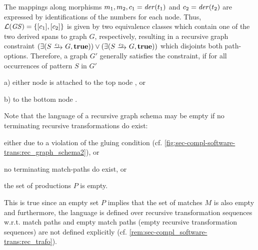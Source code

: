 \begin{remark}
The mappings along morphisms $m_1,m_2,c_1=\mathit{der}(t_1)$ and $c_2=\mathit{der}(t_2)$ are expressed by identifications of the numbers for each node.
Thus, $\mathcal{L}(\mathit{GS})=\{[c_1],[c_2]\}$ is given by two equivalence classes which contain one of the two derived spans to graph $G$, respectively, resulting in a recursive graph constraint $(\exists(S \trans{c_1} G,\true)) \vee (\exists(S \trans{c_2} G,\true))$ which disjoints both path-options.
Therefore, a graph $G'$ generally satisfies the constraint, if for all occurrences of pattern $S$ in $G'$
\begin{enumerate*}
\item[a)] either node  is attached to the top node , or
\item[b)] to the bottom node .
\end{enumerate*}
\envEndMarker
\end{remark}

\begin{remark}
Note that the language of a recursive graph schema may be empty if no terminating recursive transformations do exist: 
\begin{enumerate*}
\item either due to a violation of the gluing condition (cf. \cref{fig:sec-compl-software-trans:rec_graph_schema2}), or
\item no terminating match-paths do exist, or
\item the set of productions $P$ is empty.
\end{enumerate*}
This is true since an empty set $P$ implies that the set of matches $M$ is also empty and furthermore, the language is defined over recursive transformation sequences w.r.t. match paths and empty match paths (empty recursive transformation sequences) are not defined explicitly (cf. \cref{rem:sec-compl_software-trans:rec_trafo}).
\envEndMarker
\end{remark}

